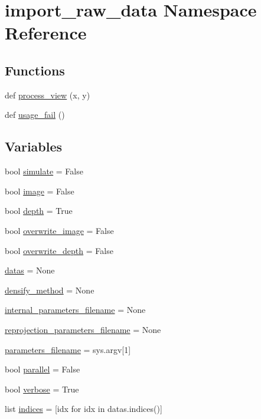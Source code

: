 \hypertarget{namespaceimport__raw__data}{}\section{import\+\_\+raw\+\_\+data Namespace Reference}
\label{namespaceimport__raw__data}
\subsection*{Functions}
\begin{DoxyCompactItemize}
\item 
def \hyperlink{namespaceimport__raw__data_a2479e719efc42b76370e1b6f5f0b9ed2}{process\+\_\+view} (x, y)
\item 
def \hyperlink{namespaceimport__raw__data_af5f24d46a4a7108f14b6f5b4f8d574fd}{usage\+\_\+fail} ()
\end{DoxyCompactItemize}
\subsection*{Variables}
\begin{DoxyCompactItemize}
\item 
bool \hyperlink{namespaceimport__raw__data_a5c1eb8a7efc38978b19a0f6d989467b4}{simulate} = False
\item 
bool \hyperlink{namespaceimport__raw__data_a509321ee90c3121a01a8a2171e576a79}{image} = False
\item 
bool \hyperlink{namespaceimport__raw__data_a8aafa011468e4613de70cabbe8c35d1d}{depth} = True
\item 
bool \hyperlink{namespaceimport__raw__data_aed53f41d71fa76451085c8cb38c369d3}{overwrite\+\_\+image} = False
\item 
bool \hyperlink{namespaceimport__raw__data_acc001998ec495e68c97a1c5ce440c0b5}{overwrite\+\_\+depth} = False
\item 
\hyperlink{namespaceimport__raw__data_a5b75cef0473666fb015a734e67b558ae}{datas} = None
\item 
\hyperlink{namespaceimport__raw__data_a445f668e0123591aff14f9040569aadf}{densify\+\_\+method} = None
\item 
\hyperlink{namespaceimport__raw__data_a3dfcf1d349b305dd0e6266949cbdf1d9}{internal\+\_\+parameters\+\_\+filename} = None
\item 
\hyperlink{namespaceimport__raw__data_a2aaddd5fd16ca08c014768394441e536}{reprojection\+\_\+parameters\+\_\+filename} = None
\item 
\hyperlink{namespaceimport__raw__data_a1b02f66a97982e45aae04a6c40ee305d}{parameters\+\_\+filename} = sys.\+argv\mbox{[}1\mbox{]}
\item 
bool \hyperlink{namespaceimport__raw__data_ac99480314bdf9fb8a8c1d14fb1122cff}{parallel} = False
\item 
bool \hyperlink{namespaceimport__raw__data_a4afd55fb1fb71444d887e41c701ce960}{verbose} = True
\item 
list \hyperlink{namespaceimport__raw__data_a0057f7e5cd87a2fb6fdeeb6d5e8bed7c}{indices} = \mbox{[}idx for idx in datas.\+indices()\mbox{]}
\end{DoxyCompactItemize}


